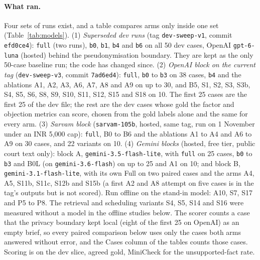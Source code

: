 \paragraph{What ran.} Four sets of runs exist, and a table compares arms only inside one set (Table~\ref{tab:models}). (1) \emph{Superseded dev runs} (tag \texttt{dev-sweep-v1}, commit \texttt{efd0ce4}): \texttt{full} (two runs), \texttt{b0}, \texttt{b1}, \texttt{b4} and \texttt{b6} on all 50 dev cases, OpenAI \texttt{gpt-6-luna} (hosted) behind the pseudonymisation boundary. They are kept as the only 50-case baseline run; the code has changed since. (2) \emph{OpenAI block on the current tag} (\texttt{dev-sweep-v3}, commit \texttt{7ad6ed4}): \texttt{full}, \texttt{b0} to \texttt{b3} on 38 cases, \texttt{b4} and the ablations A1, A2, A3, A6, A7, A8 and A9 on up to 30, and B5, S1, S2, S3, S3b, S4, S5, S6, S8, S9, S10, S11, S12, S15 and S18 on 10. The first 25 cases are the first 25 of the dev file; the rest are the dev cases whose gold the factor and objection metrics can score, chosen from the gold labels alone and the same for every arm. (3) \emph{Sarvam block} (\texttt{sarvam-105b}, hosted, same tag, run on 1 November under an INR 5{,}000 cap): \texttt{full}, B0 to B6 and the ablations A1 to A4 and A6 to A9 on 30 cases, and 22 variants on 10. (4) \emph{Gemini blocks} (hosted, free tier, public court text only): block A, \texttt{gemini-3.5-flash-lite}, with \texttt{full} on 25 cases, \texttt{b0} to \texttt{b3} and B0L (on \texttt{gemini-3.6-flash}) on up to 25 and A1 on 10; and block B, \texttt{gemini-3.1-flash-lite}, with its own Full on two paired cases and the arms A4, A5, S11b, S11c, S12b and S15b (a first A2 and A8 attempt on five cases is in the tag's outputs but is not scored). Run offline on the stand-in model: A10, S7, S17 and P5 to P8. The retrieval and scheduling variants S4, S5, S14 and S16 were measured without a model in the offline studies below. The scorer counts a case that the privacy boundary kept local (eight of the first 25 on OpenAI) as an empty brief, so every paired comparison below uses only the cases both arms answered without error, and the Cases column of the tables counts those cases. Scoring is on the dev slice, agreed gold, MiniCheck for the unsupported-fact rate.

